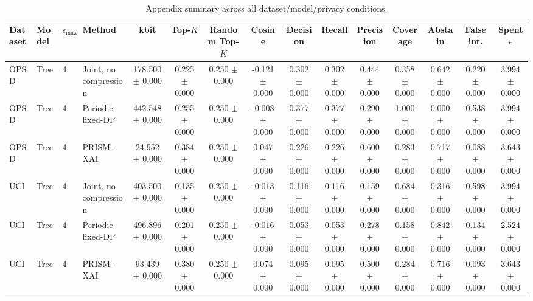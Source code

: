 \begin{table}[t]
\caption{Appendix summary across all dataset/model/privacy conditions.}
\label{tab:appendix-conditions}
\centering
\scriptsize
\setlength{\tabcolsep}{2.5pt}
\begin{tabular}{llllccccccccccc}
\toprule
Dataset & Model & $\epsilon_{\max}$ & Method & kbit & Top-$K$ & Random Top-$K$ & Cosine & Decision & Recall & Precision & Coverage & Abstain & False int. & Spent $\epsilon$ \\
\midrule
OPSD & Tree & 4 & Joint, no compression & 178.500 $\pm$ 0.000 & 0.225 $\pm$ 0.000 & 0.250 $\pm$ 0.000 & -0.121 $\pm$ 0.000 & 0.302 $\pm$ 0.000 & 0.302 $\pm$ 0.000 & 0.444 $\pm$ 0.000 & 0.358 $\pm$ 0.000 & 0.642 $\pm$ 0.000 & 0.220 $\pm$ 0.000 & 3.994 $\pm$ 0.000 \\
OPSD & Tree & 4 & Periodic fixed-DP & 442.548 $\pm$ 0.000 & 0.255 $\pm$ 0.000 & 0.250 $\pm$ 0.000 & -0.008 $\pm$ 0.000 & 0.377 $\pm$ 0.000 & 0.377 $\pm$ 0.000 & 0.290 $\pm$ 0.000 & 1.000 $\pm$ 0.000 & 0.000 $\pm$ 0.000 & 0.538 $\pm$ 0.000 & 3.994 $\pm$ 0.000 \\
OPSD & Tree & 4 & PRISM-XAI & 24.952 $\pm$ 0.000 & 0.384 $\pm$ 0.000 & 0.250 $\pm$ 0.000 & 0.047 $\pm$ 0.000 & 0.226 $\pm$ 0.000 & 0.226 $\pm$ 0.000 & 0.600 $\pm$ 0.000 & 0.283 $\pm$ 0.000 & 0.717 $\pm$ 0.000 & 0.088 $\pm$ 0.000 & 3.643 $\pm$ 0.000 \\
UCI & Tree & 4 & Joint, no compression & 403.500 $\pm$ 0.000 & 0.135 $\pm$ 0.000 & 0.250 $\pm$ 0.000 & -0.013 $\pm$ 0.000 & 0.116 $\pm$ 0.000 & 0.116 $\pm$ 0.000 & 0.159 $\pm$ 0.000 & 0.684 $\pm$ 0.000 & 0.316 $\pm$ 0.000 & 0.598 $\pm$ 0.000 & 3.994 $\pm$ 0.000 \\
UCI & Tree & 4 & Periodic fixed-DP & 496.896 $\pm$ 0.000 & 0.201 $\pm$ 0.000 & 0.250 $\pm$ 0.000 & -0.016 $\pm$ 0.000 & 0.053 $\pm$ 0.000 & 0.053 $\pm$ 0.000 & 0.278 $\pm$ 0.000 & 0.158 $\pm$ 0.000 & 0.842 $\pm$ 0.000 & 0.134 $\pm$ 0.000 & 2.524 $\pm$ 0.000 \\
UCI & Tree & 4 & PRISM-XAI & 93.439 $\pm$ 0.000 & 0.380 $\pm$ 0.000 & 0.250 $\pm$ 0.000 & 0.074 $\pm$ 0.000 & 0.095 $\pm$ 0.000 & 0.095 $\pm$ 0.000 & 0.500 $\pm$ 0.000 & 0.284 $\pm$ 0.000 & 0.716 $\pm$ 0.000 & 0.093 $\pm$ 0.000 & 3.643 $\pm$ 0.000 \\
\bottomrule
\end{tabular}
\end{table}
